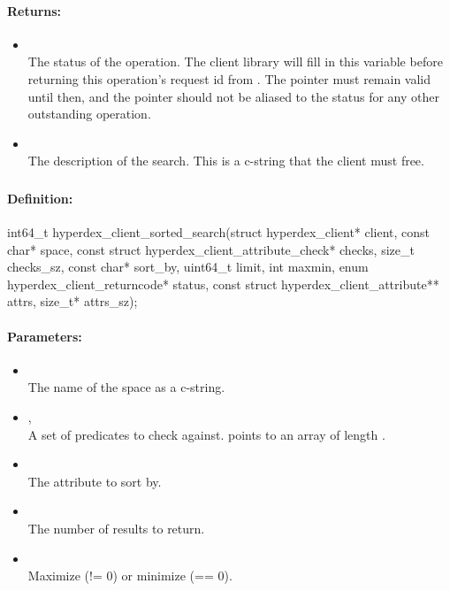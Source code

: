 \paragraph{Returns:}
\begin{itemize}[noitemsep]
\item {}\\
The status of the operation.  The client library will fill in this variable before returning this operation's request id from .  The pointer must remain valid until then, and the pointer should not be aliased to the status for any other outstanding operation.
\item {}\\
The description of the search.  This is a c-string that the client must free.
\end{itemize}

\pagebreak
\subsubsection{}
\label{api:c:sorted_search}


\paragraph{Definition:}
\begin{ccode}
int64_t hyperdex_client_sorted_search(struct hyperdex_client* client,
        const char* space,
        const struct hyperdex_client_attribute_check* checks, size_t checks_sz,
        const char* sort_by,
        uint64_t limit,
        int maxmin,
        enum hyperdex_client_returncode* status,
        const struct hyperdex_client_attribute** attrs, size_t* attrs_sz);
\end{ccode}

\paragraph{Parameters:}
\begin{itemize}[noitemsep]
\item {}\\
The name of the space as a c-string.
\item {}, \\
A set of predicates to check against.   points to an array of length .
\item {}\\
The attribute to sort by.
\item {}\\
The number of results to return.
\item {}\\
Maximize (!= 0) or minimize (== 0).
\end{itemize}

